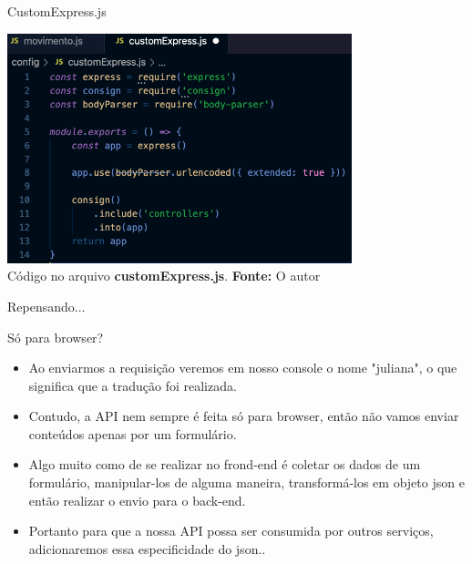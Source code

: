 \documentclass{beamer}
\begin{document}
    \begin{frame}[label=lists]{CustomExpress.js}
	\begin{center}
    		\includegraphics[width=100mm]{resources/aula5_2.png}\\
	        \tiny{ Código no arquivo \textbf{customExpress.js}. \textbf{Fonte:} O autor}
	 \end{center}
    \end{frame}
    \begin{frame}[label=proof]{Repensando...}
    \begin{alertblock}{Só para browser?}
	\begin{itemize}
	\item Ao enviarmos a requisição veremos em nosso console o nome "juliana", o que significa que a tradução foi realizada. 
	\item Contudo, a API nem sempre é feita só para browser, então não vamos enviar conteúdos apenas por um formulário.
	\item Algo muito como de se realizar no frond-end é coletar os dados de um formulário, manipular-los de alguma maneira, transformá-los em objeto json e então realizar o envio para o back-end.
	\item Portanto para que a nossa API possa ser consumida por outros serviços, adicionaremos essa especificidade do json..
	\end{itemize}
	\end{alertblock}
    \end{frame}
\end{document}
